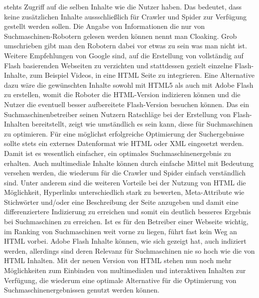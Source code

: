 stehts Zugriff auf die selben Inhalte wie die Nutzer haben. Das bedeutet,
dass keine zusätzlichen Inhalte aussschließlich für Crawler und Spider zur
Verfügung gestellt werden sollen. Die Angabe von Informationen die nur von
Suchmaschinen-Robotern gelesen werden können nennt man Cloaking. Grob
umschrieben gibt man den Robotern dabei vor etwas zu sein was man nicht ist.
Weitere Empfehlungen von Google sind, auf die Erstellung von vollständig
auf Flash basierenden Webseiten zu verzichten und stattdessen gezielt
einzelne Flash-Inhalte, zum Beispiel Videos, in eine HTML Seite zu
integrieren. Eine Alternative dazu wäre die gewünschten Inhalte sowohl mit
HTML5 als auch mit Adobe Flash zu erstellen, womit die Roboter die
HTML-Version indizieren können und die Nutzer die eventuell besser
aufbereitete Flash-Version besuchen können.
\newline\newline
Das ein Suchmaschinenbetreiber seinen Nutzern Ratschläge bei der Erstellung
von Flash-Inhalten bereitstellt, zeigt wie umständlich es sein kann, diese für
Suchmaschinen zu optimieren. Für eine möglichst erfolgreiche Optimierung
der Suchergebnisse sollte stets ein externes Datenformat wie HTML oder
XML eingesetzt werden. Damit ist es wesentlich einfacher, ein optimales
Suchmaschinenergebnis zu erhalten. Auch multimediale Inhalte können
durch einfache Mittel mit Bedeutung versehen werden, die wiederum für die
Crawler und Spider einfach verständlich sind. Unter anderem sind die weiteren
Vorteile bei der Nutzung von HTML die Möglichkeit, Hyperlinks unterschiedlich
stark zu bewerten, Meta-Attribute wie Stichwörter und/oder eine Beschreibung
der Seite anzugeben und damit eine differenziertere Indizierung zu erreichen
und somit ein deutlich besseres Ergebnis bei Suchmaschinen zu erreichen.
\newline\newline
Ist es für den Betreiber einer Webseite wichtig, im Ranking von Suchmaschinen
weit vorne zu liegen, führt fast kein Weg an HTML vorbei. Adobe Flash Inhalte
können, wie sich gezeigt hat, auch indiziert werden, allerdings sind deren
Relevanz für Suchmaschinen nie so hoch wie die von HTML Inhalten.
Mit der neuen Version von HTML stehen nun noch mehr Möglichkeiten zum Einbinden
von multimedialen und interaktiven Inhalten zur Verfügung, die wiederum
eine optimale Alternative für die Optimierung von Suchmaschinenergebnissen
genutzt werden können.


